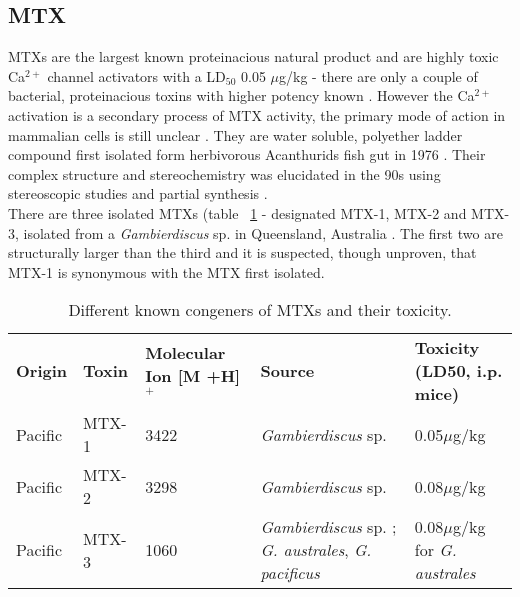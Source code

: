 \documentclass[12pt]{article}
\begin{document}
\subsection{MTX}

MTXs are the largest known proteinacious natural product \cite{yokoyama1988some,murata1993structure} and are highly toxic Ca$^{2+}$ channel activators with a LD$_{50}$ 0.05 $\mu$g/kg - there are only a couple of bacterial, proteinacious toxins with higher potency known \cite{yokoyama1988some,murata1993structure}. However the Ca$^{2+}$ activation is a secondary process of MTX activity, the primary mode of action in mammalian cells  is still unclear \cite{van2000diversity}. They are water soluble, polyether ladder compound first isolated form herbivorous Acanthurids fish gut in 1976 \cite{yasumoto1976toxicity}. Their complex structure and stereochemistry was elucidated in the 90s using stereoscopic studies and partial synthesis \cite{murata1993structure,murata1994structure,satake1995structural,nonomura1996complete,zheng1996complete}. \\
There are three isolated MTXs (table ~\ref{tbl:MTXTable} - designated MTX-1, MTX-2 and MTX-3, isolated from a \emph{Gambierdiscus} sp. in Queensland, Australia \cite{holmes1994purification}. The first two are structurally larger than the third and it is suspected, though unproven, that MTX-1 is synonymous with the MTX first isolated. \\ %



\begin{table}
\caption{Different known congeners of MTXs and their toxicity.}
\label{tbl:MTXTable}
\begin{tabular}{   p{2cm}  p{2cm}  p{3cm}  p{3cm}  p{4cm}  }
\textbf{Origin} & \textbf{Toxin} & \textbf{Molecular Ion [M +H]$^{+}$} & \textbf{Source} & \textbf{Toxicity (LD50, i.p. mice)} \\
 Pacific & MTX-1 & 3422 \cite{holmes1994purification,murata1993structure} & \emph{Gambierdiscus} sp. \cite{holmes1994purification} & 0.05$\mu$g/kg \cite{murata1993structure}\\
 Pacific & MTX-2 & 3298 \cite{holmes1994purification} & \emph{Gambierdiscus} sp. \cite{holmes1994purification} & 0.08$\mu$g/kg \cite{holmes1994purification}\\
 Pacific & MTX-3 & 1060   \cite{holmes1994purification} & \emph{Gambierdiscus} sp. \cite{holmes1994purification}; \emph{G. australes}, \emph{G. pacificus} \cite{rhodes2014production} &  0.08$\mu$g/kg for \emph{G. australes}  \cite{rhodes2014production} \\
\end{tabular}
\end{table}
\FloatBarrier
\end{document}
